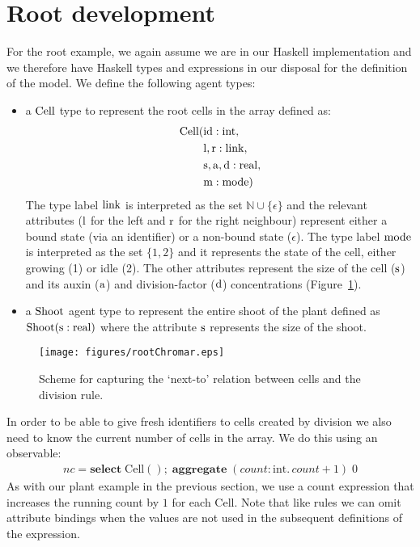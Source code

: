\section{Root development}
\label{sec:rootDev}
For the root example, we again assume we are in our Haskell implementation and
we therefore have Haskell types and expressions in our disposal for the
definition of the model. We define the following agent types:
\begin{itemize}
\item a $\mathrm{Cell}$ type to represent the root cells in the array defined as:
  \begin{align*}
    \mathrm{Cell}(&\mathrm{id}: \mathrm{int}, \\
              &\mathrm{l, r}: \mathrm{link}, \\
              &\mathrm{s, a, d}: \mathrm{real}, \\
              &\mathrm{m}:\mathrm{mode})
    \end{align*}
    The type label $\mathrm{link}$ is interpreted as the set
    $\mathbb{N} \cup \{\epsilon\}$ and the relevant attributes ($\mathrm{l}$ for the
    left and $\mathrm{r}$ for the right neighbour) represent either a bound state
    (via an identifier) or a non-bound state ($\epsilon$). The type label
    $\mathrm{mode}$ is interpreted as the set $\{ 1, 2 \}$ and it represents the
    state of the cell, either growing (1) or idle (2). The other attributes
    represent the size of the cell ($\mathrm{s}$) and its auxin ($\mathrm{a}$) and
    division-factor ($\mathrm{d}$) concentrations (Figure~\ref{fig:rootDevChromar}).
  \item a $\mathrm{Shoot}$ agent type to represent the entire shoot of the plant
    defined as $\mathrm{Shoot}(\mathrm{s}: \mathrm{real})$ where the attribute $\mathrm{s}$
    represents the size of the shoot.
  \end{itemize}
  
\begin{figure}
    \centering
    \texttt{[image: figures/rootChromar.eps]}
    \caption{Scheme for capturing the `next-to' relation between cells and the
      division rule.}
    \label{fig:rootDevChromar}
  \end{figure}

In order to be able to give fresh identifiers to cells created by division we
also need to know the current number of cells in the array. We do this using
an observable:
\begin{align*}
nc = \mathbf{select} \; \mathrm{Cell}()\mathbf{;} \;\mathbf{aggregate} \; (count: \mathrm{int}.\, count + 1) \; 0
\end{align*}
As with our plant example in the previous section, we use a $\mathrm{count}$
expression that increases the running count by $1$ for each
$\mathrm{Cell}$. Note that like rules we can omit attribute bindings when the
values are not used in the subsequent definitions of the expression.

